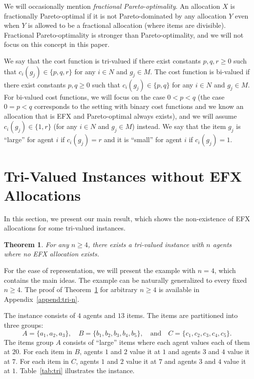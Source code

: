 \documentclass{article}
\newtheorem{theorem}{Theorem}
\theoremstyle{definition}
\begin{document}
We will occasionally mention \emph{fractional Pareto-optimality}.
An allocation $X$ is fractionally Pareto-optimal if it is not Pareto-dominated by any allocation $Y$ even when $Y$ is allowed to be a fractional allocation (where items are divisible).
Fractional Pareto-optimality is stronger than Pareto-optimality, and we will not focus on this concept in this paper.

We say that the cost function is tri-valued if there exist constants $p,q,r\geq 0$ such that $c_i(g_j)\in\{p,q,r\}$ for any $i\in N$ and $g_j\in M$.
The cost function is bi-valued if there exist constants $p,q\geq 0$ such that $c_i(g_j)\in\{p,q\}$ for any $i\in N$ and $g_j\in M$.
For bi-valued cost functions, we will focus on the case $0<p<q$ (the case $0=p<q$ corresponds to the setting with binary cost functions and we know an allocation that is EFX and Pareto-optimal always exists), and we will assume $c_i(g_j)\in\{1,r\}$ (for any $i\in N$ and $g_j\in M$) instead.
We say that the item $g_j$ is ``large'' for agent $i$ if $c_i(g_j)=r$ and it is ``small'' for agent $i$ if $c_i(g_j)=1$.


\section{Tri-Valued Instances without EFX Allocations}
\label{sec:tri}

In this section, we present our main result, which shows the non-existence of EFX allocations for some tri-valued instances.

\begin{theorem}\label{thm:tri}
    For any $n\geq 4$, there exists a tri-valued instance with $n$ agents where no EFX allocation exists.
\end{theorem}

For the ease of representation, we will present the example with $n=4$, which contains the main ideas.
The example can be naturally generalized to every fixed $n\geq 4$.
The proof of Theorem~\ref{thm:tri} for arbitrary $n\geq4$ is available in Appendix~\ref{append:tri-n}.

The instance consists of $4$ agents and $13$ items.
The items are partitioned into three groups:
$$A=\{a_1,a_2,a_3\},\quad B=\{b_1,b_2,b_3,b_4,b_5\},\quad\mbox{and}\quad C=\{c_1,c_2,c_3,c_4,c_5\}.$$
The items group $A$ consists of ``large'' items where each agent values each of them at $20$.
For each item in $B$, agents $1$ and $2$ value it at $1$ and agents $3$ and $4$ value it at $7$.
For each item in $C$, agents $1$ and $2$ value it at $7$ and agents $3$ and $4$ value it at $1$.
Table~\ref{tab:tri} illustrates the instance.
\end{document}
